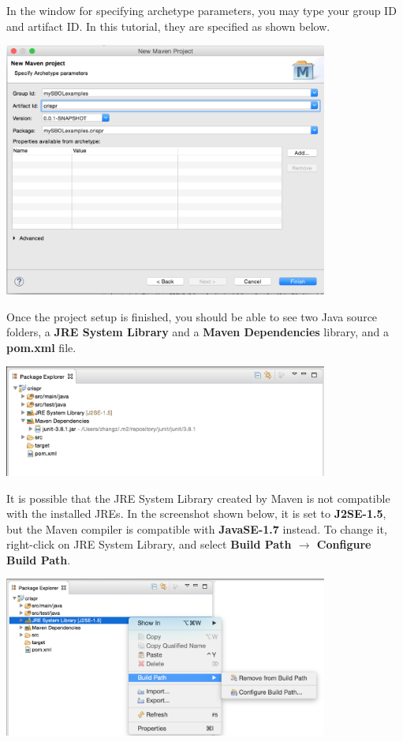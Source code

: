 In the window for specifying archetype parameters, you may type your group ID and artifact ID. In this tutorial, they are specified as shown below. 
\begin{center}
  \includegraphics[width=0.8\textwidth]{figures/createNewMavenProject5}
\end{center}

Once the project setup is finished, you should be able to see two Java source folders, a {\bf JRE System Library} and a {\bf Maven Dependencies} library, and a {\bf pom.xml} file. 
\begin{center}
  \includegraphics[width=0.8\textwidth]{figures/createNewMavenProject6}
\end{center}

It is possible that the JRE System Library created by Maven is not compatible with the installed JREs. In the screenshot shown below, it is set to {\bf J2SE-1.5}, but the Maven compiler is compatible with {\bf JavaSE-1.7} instead. To change it, right-click on JRE System Library, and select {\bf Build Path $\rightarrow$ Configure Build Path}. 
\begin{center}
  \includegraphics[width=0.8\textwidth]{figures/createNewMavenProject7}
\end{center}

